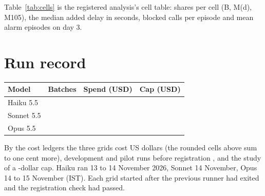 \documentclass[sigconf]{acmart}
\begin{document}
Table~\ref{tab:cells} is the registered analysis's cell table: shares per cell (B, M(d), M105), the median
added delay in seconds, blocked calls per episode and mean alarm episodes on day 3.

\begin{table}[p]
\caption{Every cell of the three grids (\texttt{operator\_in\_the\_loop\_ol1\_result.json}, field
\texttt{tables}).}
\label{tab:cells}
\scriptsize

\end{table}

\section{Run record}
\label{app:run}

\begin{tabular}{@{}lrrr@{}}
\toprule
Model & Batches & Spend (USD) & Cap (USD) \\
\midrule
Haiku 5.5 & \VRunHaikuBatches{} & \VRunHaikuSpend{} & \VRunHaikuCap{} \\
Sonnet 5.5 & \VRunSonnetBatches{} & \VRunSonnetSpend{} & \VRunSonnetCap{} \\
Opus 5.5 & \VRunOpusBatches{} & \VRunOpusSpend{} & \VRunOpusCap{} \\
\bottomrule
\end{tabular}

\smallskip
By the cost ledgers the three grids cost \VRunGrids{} US dollars (the rounded cells above sum to one cent
more), development and pilot runs before registration \VRunDev{}, and the study \VRunTotal{} of a
\VRunCapTotal{}-dollar cap. Haiku ran
13 to 14 November 2026, Sonnet 14 November, Opus 14 to 15 November (IST). Each grid started after the
previous runner had exited and the registration check had passed.
\end{document}

